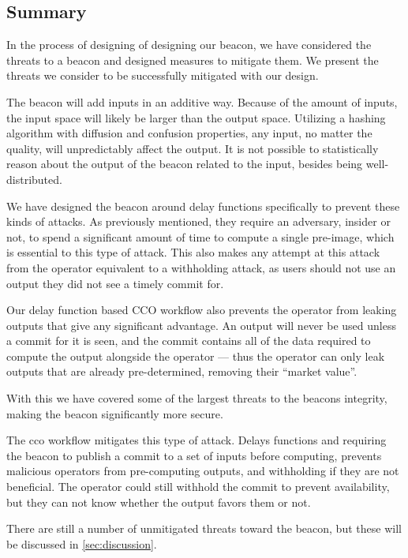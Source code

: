 \subsection{Summary}
In the process of designing of designing our beacon, we have considered the threats to a beacon and designed measures to mitigate them. We present the threats we consider to be successfully mitigated with our design.

The beacon will add inputs in an additive way. Because of the amount of inputs, the input space will likely be larger than the output space.
Utilizing a hashing algorithm with diffusion and confusion properties, any input, no matter the quality, will unpredictably affect the output.
It is not possible to statistically reason about the output of the beacon related to the input, besides being well-distributed.

We have designed the beacon around delay functions specifically to prevent these kinds of attacks. As previously mentioned, they require an adversary, insider or not, to spend a significant amount of time to compute a single pre-image, which is essential to this type of attack.
This also makes any attempt at this attack from the operator equivalent to a withholding attack, as users should not use an output they did not see a timely commit for.

Our delay function based CCO workflow also prevents the operator from leaking outputs that give any significant advantage. An output will never be used unless a commit for it is seen, and the commit contains all of the data required to compute the output alongside the operator --- thus the operator can only leak outputs that are already pre-determined, removing their \enquote{market value}.

With this we have covered some of the largest threats to the beacons integrity, making the beacon significantly more secure.

The \acrshort{cco} workflow mitigates this type of attack. Delays functions and requiring the beacon to publish a commit to a set of inputs before computing, prevents malicious operators from pre-computing outputs, and withholding if they are not beneficial. The operator could still withhold the commit to prevent availability, but they can not know whether the output favors them or not.

There are still a number of unmitigated threats toward the beacon, but these will be discussed in \vref{sec:discussion}.